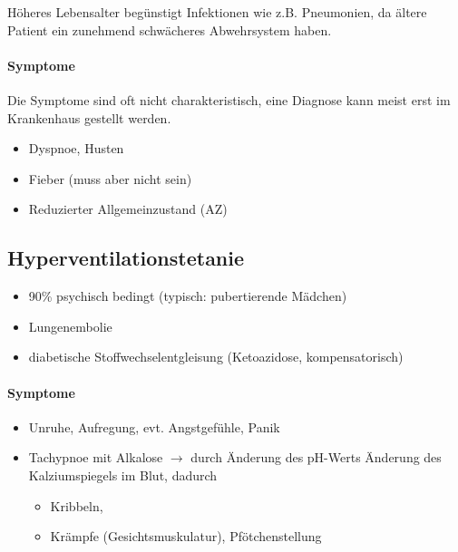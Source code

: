 Höheres Lebensalter begünstigt Infektionen wie z.B.
Pneumonien, da ältere Patient ein zunehmend schwächeres
Abwehrsystem haben.

\paragraph{Symptome}

Die Symptome sind oft nicht charakteristisch, eine Diagnose kann meist
erst im Krankenhaus gestellt werden. 

\begin{itemize}
    \item Dyspnoe, Husten
    \item Fieber (muss aber nicht sein)
    \item Reduzierter Allgemeinzustand (AZ)
\end{itemize}



\subsection{Hyperventilationstetanie}\label{topic:hyperventilationstetanie}
\begin{itemize}
  \item 90\% psychisch bedingt (typisch: pubertierende 
  Mädchen)
  \item Lungenembolie
  \item diabetische Stoffwechselentgleisung (Ketoazidose, kompensatorisch)
\end{itemize}


\paragraph{Symptome}

\begin{itemize}
\item Unruhe, Aufregung, evt. Angstgefühle, Panik
\item Tachypnoe mit Alkalose $\rightarrow$ durch Änderung
des pH-Werts Änderung des Kalziumspiegels im Blut, dadurch
\begin{itemize}
    \item Kribbeln, 
\item Krämpfe (Gesichtsmuskulatur),  Pfötchenstellung
\end{itemize}
\end{itemize}

